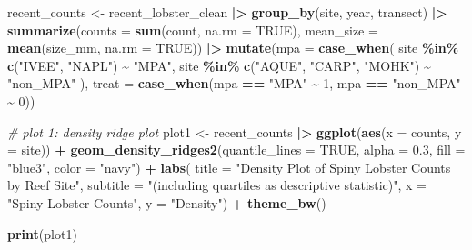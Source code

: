 \documentclass[
]{article}
\newenvironment{Shaded}{\begin{snugshade}}{\end{snugshade}}
\newcommand{\AttributeTok}[1]{\textcolor[rgb]{0.13,0.29,0.53}{#1}}
\newcommand{\CommentTok}[1]{\textcolor[rgb]{0.56,0.35,0.01}{\textit{#1}}}
\newcommand{\ConstantTok}[1]{\textcolor[rgb]{0.56,0.35,0.01}{#1}}
\newcommand{\DecValTok}[1]{\textcolor[rgb]{0.00,0.00,0.81}{#1}}
\newcommand{\FloatTok}[1]{\textcolor[rgb]{0.00,0.00,0.81}{#1}}
\newcommand{\FunctionTok}[1]{\textcolor[rgb]{0.13,0.29,0.53}{\textbf{#1}}}
\newcommand{\NormalTok}[1]{#1}
\newcommand{\OtherTok}[1]{\textcolor[rgb]{0.56,0.35,0.01}{#1}}
\newcommand{\SpecialCharTok}[1]{\textcolor[rgb]{0.81,0.36,0.00}{\textbf{#1}}}
\newcommand{\StringTok}[1]{\textcolor[rgb]{0.31,0.60,0.02}{#1}}
\begin{document}
\begin{Shaded}
\begin{Highlighting}[]
\NormalTok{recent\_counts }\OtherTok{\textless{}{-}}\NormalTok{ recent\_lobster\_clean }\SpecialCharTok{|\textgreater{}} 
    \FunctionTok{group\_by}\NormalTok{(site, year, transect) }\SpecialCharTok{|\textgreater{}} 
    \FunctionTok{summarize}\NormalTok{(}\AttributeTok{counts =} \FunctionTok{sum}\NormalTok{(count, }\AttributeTok{na.rm =} \ConstantTok{TRUE}\NormalTok{),}
              \AttributeTok{mean\_size =} \FunctionTok{mean}\NormalTok{(size\_mm, }\AttributeTok{na.rm =} \ConstantTok{TRUE}\NormalTok{)) }\SpecialCharTok{|\textgreater{}} 
    \FunctionTok{mutate}\NormalTok{(}\AttributeTok{mpa =} \FunctionTok{case\_when}\NormalTok{(}
\NormalTok{        site }\SpecialCharTok{\%in\%} \FunctionTok{c}\NormalTok{(}\StringTok{"IVEE"}\NormalTok{, }\StringTok{"NAPL"}\NormalTok{) }\SpecialCharTok{\textasciitilde{}} \StringTok{"MPA"}\NormalTok{,}
\NormalTok{        site }\SpecialCharTok{\%in\%} \FunctionTok{c}\NormalTok{(}\StringTok{"AQUE"}\NormalTok{, }\StringTok{"CARP"}\NormalTok{, }\StringTok{"MOHK"}\NormalTok{) }\SpecialCharTok{\textasciitilde{}} \StringTok{"non\_MPA"}
\NormalTok{    ), }\AttributeTok{treat =} \FunctionTok{case\_when}\NormalTok{(mpa }\SpecialCharTok{==} \StringTok{"MPA"} \SpecialCharTok{\textasciitilde{}} \DecValTok{1}\NormalTok{,}
\NormalTok{                        mpa }\SpecialCharTok{==} \StringTok{"non\_MPA"} \SpecialCharTok{\textasciitilde{}} \DecValTok{0}\NormalTok{))}
\end{Highlighting}
\end{Shaded}

\begin{Shaded}
\begin{Highlighting}[]
\CommentTok{\# plot 1: density ridge plot}
\NormalTok{plot1 }\OtherTok{\textless{}{-}}\NormalTok{ recent\_counts }\SpecialCharTok{|\textgreater{}} 
    \FunctionTok{ggplot}\NormalTok{(}\FunctionTok{aes}\NormalTok{(}\AttributeTok{x =}\NormalTok{ counts, }\AttributeTok{y =}\NormalTok{ site)) }\SpecialCharTok{+}
    \FunctionTok{geom\_density\_ridges2}\NormalTok{(}\AttributeTok{quantile\_lines =} \ConstantTok{TRUE}\NormalTok{,}
                         \AttributeTok{alpha =} \FloatTok{0.3}\NormalTok{,}
                         \AttributeTok{fill =} \StringTok{"blue3"}\NormalTok{,}
                         \AttributeTok{color =} \StringTok{"navy"}\NormalTok{) }\SpecialCharTok{+}
    \FunctionTok{labs}\NormalTok{(}
        \AttributeTok{title =} \StringTok{"Density Plot of Spiny Lobster Counts by Reef Site"}\NormalTok{,}
        \AttributeTok{subtitle =} \StringTok{"(including quartiles as descriptive statistic)"}\NormalTok{,}
        \AttributeTok{x =} \StringTok{"Spiny Lobster Counts"}\NormalTok{,}
        \AttributeTok{y =} \StringTok{"Density"}\NormalTok{) }\SpecialCharTok{+}
    \FunctionTok{theme\_bw}\NormalTok{()}

\FunctionTok{print}\NormalTok{(plot1)}
\end{Highlighting}
\end{Shaded}
\end{document}
